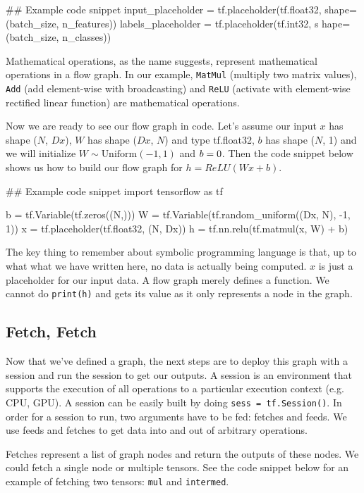 \documentclass{tufte-handout}
\begin{document}
\begin{python}
## Example code snippet
input_placeholder = tf.placeholder(tf.float32,
					shape=(batch_size, n_features))
labels_placeholder = tf.placeholder(tf.int32, s
					hape=(batch_size, n_classes))
\end{python}

Mathematical operations, as the name suggests, represent mathematical operations in a flow graph. In our example, \texttt{MatMul} (multiply two matrix values), \texttt{Add} (add element-wise with broadcasting) and \texttt{ReLU} (activate with element-wise rectified linear function) are mathematical operations.

Now we are ready to see our flow graph in code. Let's assume our input $x$ has shape ($N$, $Dx$), $W$ has shape ($Dx$, $N$) and type tf.float32, $b$ has shape ($N$, 1) and we will initialize $W\sim \textrm{Uniform}(-1, 1)$ and $b = \boldmath{0}$. Then the code snippet below shows us how to build our flow graph for $h = ReLU(Wx + b)$.  

\begin{python}
## Example code snippet
import tensorflow as tf

b = tf.Variable(tf.zeros((N,)))
W = tf.Variable(tf.random_uniform((Dx, N), -1, 1))
x = tf.placeholder(tf.float32, (N, Dx))
h = tf.nn.relu(tf.matmul(x, W) + b)

\end{python}

The key thing to remember about symbolic programming language is that, up to what what we have written here, no data is actually being computed. $x$ is just a placeholder for our input data. A flow graph merely defines a function. We cannot do \texttt{print(h)} and gets its value as it only represents a node in the graph. 

\subsection{Fetch, Fetch}
Now that we've defined a graph, the next steps are to deploy this graph with a session and run the session to get our outputs. A session is an environment that supports the execution of all operations to a particular execution context (e.g. CPU, GPU). A session can be easily built by doing \texttt{sess = tf.Session()}. In order for a session to run, two arguments have to be fed: fetches and feeds. We use feeds and fetches to get data into and out of arbitrary operations.

Fetches represent a list of graph nodes and return the outputs of these nodes. We could fetch a single node or multiple tensors. See the code snippet below for an example of fetching two tensors: \texttt{mul} and \texttt{intermed}. 
\end{document}
